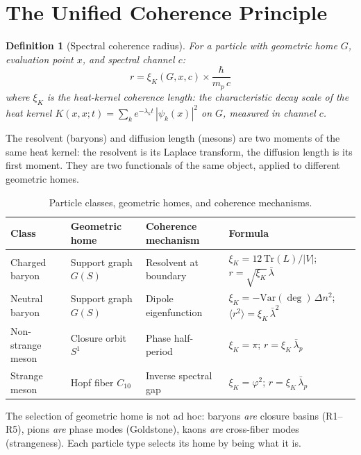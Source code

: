 \documentclass[12pt]{article}
\newtheorem{definition}[theorem]{Definition}
\newcommand{\phig}{\varphi}
\newcommand{\lbar}{\bar{\lambda}}
\begin{document}
\section{The Unified Coherence Principle}\label{sec:unified}

\begin{definition}[Spectral coherence radius]
For a particle with geometric home $G$, evaluation point $x$, and spectral channel $c$:
\begin{equation}\label{eq:unified}
    r = \xi_K(G, x, c) \times \frac{\hbar}{m_p\,c}
\end{equation}
where $\xi_K$ is the heat-kernel coherence length: the characteristic decay scale of the heat kernel $K(x,x;t) = \sum_k e^{-\lambda_k t}\,|\psi_k(x)|^2$ on $G$, measured in channel $c$.
\end{definition}

The resolvent (baryons) and diffusion length (mesons) are two moments of the same heat kernel: the resolvent is its Laplace transform, the diffusion length is its first moment. They are two functionals of the same object, applied to different geometric homes.

\begin{table}[ht]
\centering
\caption{Particle classes, geometric homes, and coherence mechanisms.}
\label{tab:unified}
\begin{tabular}{@{}llll@{}}
\toprule
Class & Geometric home & Coherence mechanism & Formula \\
\midrule
Charged baryon & Support graph $G(S)$ & Resolvent at boundary & $\xi_K = 12\,\mathrm{Tr}(L)/|V|$; $r = \sqrt{\xi_K}\,\lbar$ \\
Neutral baryon & Support graph $G(S)$ & Dipole eigenfunction & $\xi_K = -\mathrm{Var}(\deg)\,\Delta n^2$; $\langle r^2\rangle = \xi_K\,\lbar^2$ \\
Non-strange meson & Closure orbit $S^1$ & Phase half-period & $\xi_K = \pi$; $r = \xi_K\,\lbar_p$ \\
Strange meson & Hopf fiber $C_{10}$ & Inverse spectral gap & $\xi_K = \phig^2$; $r = \xi_K\,\lbar_p$ \\
\bottomrule
\end{tabular}
\end{table}

The selection of geometric home is not ad hoc: baryons \textit{are} closure basins (R1--R5), pions \textit{are} phase modes (Goldstone), kaons \textit{are} cross-fiber modes (strangeness). Each particle type selects its home by being what it is.
\end{document}
